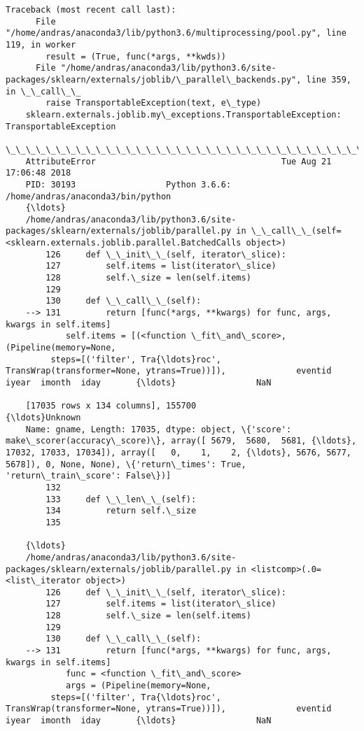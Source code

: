 \documentclass[11pt]{article}
\begin{document}
\begin{Verbatim}[commandchars=\\\{\}]
    Traceback (most recent call last):
      File "/home/andras/anaconda3/lib/python3.6/multiprocessing/pool.py", line 119, in worker
        result = (True, func(*args, **kwds))
      File "/home/andras/anaconda3/lib/python3.6/site-packages/sklearn/externals/joblib/\_parallel\_backends.py", line 359, in \_\_call\_\_
        raise TransportableException(text, e\_type)
    sklearn.externals.joblib.my\_exceptions.TransportableException: TransportableException
    \_\_\_\_\_\_\_\_\_\_\_\_\_\_\_\_\_\_\_\_\_\_\_\_\_\_\_\_\_\_\_\_\_\_\_\_\_\_\_\_\_\_\_\_\_\_\_\_\_\_\_\_\_\_\_\_\_\_\_\_\_\_\_\_\_\_\_\_\_\_\_\_\_\_\_
    AttributeError                                     Tue Aug 21 17:06:48 2018
    PID: 30193                  Python 3.6.6: /home/andras/anaconda3/bin/python
    {\ldots}
    /home/andras/anaconda3/lib/python3.6/site-packages/sklearn/externals/joblib/parallel.py in \_\_call\_\_(self=<sklearn.externals.joblib.parallel.BatchedCalls object>)
        126     def \_\_init\_\_(self, iterator\_slice):
        127         self.items = list(iterator\_slice)
        128         self.\_size = len(self.items)
        129 
        130     def \_\_call\_\_(self):
    --> 131         return [func(*args, **kwargs) for func, args, kwargs in self.items]
            self.items = [(<function \_fit\_and\_score>, (Pipeline(memory=None,
         steps=[('filter', Tra{\ldots}roc', TransWrap(transformer=None, ytrans=True))]),              eventid  iyear  imonth  iday       {\ldots}                NaN  
    
    [17035 rows x 134 columns], 155700                                          {\ldots}Unknown
    Name: gname, Length: 17035, dtype: object, \{'score': make\_scorer(accuracy\_score)\}, array([ 5679,  5680,  5681, {\ldots}, 17032, 17033, 17034]), array([   0,    1,    2, {\ldots}, 5676, 5677, 5678]), 0, None, None), \{'return\_times': True, 'return\_train\_score': False\})]
        132 
        133     def \_\_len\_\_(self):
        134         return self.\_size
        135 
    
    {\ldots}
    /home/andras/anaconda3/lib/python3.6/site-packages/sklearn/externals/joblib/parallel.py in <listcomp>(.0=<list\_iterator object>)
        126     def \_\_init\_\_(self, iterator\_slice):
        127         self.items = list(iterator\_slice)
        128         self.\_size = len(self.items)
        129 
        130     def \_\_call\_\_(self):
    --> 131         return [func(*args, **kwargs) for func, args, kwargs in self.items]
            func = <function \_fit\_and\_score>
            args = (Pipeline(memory=None,
         steps=[('filter', Tra{\ldots}roc', TransWrap(transformer=None, ytrans=True))]),              eventid  iyear  imonth  iday       {\ldots}                NaN  
    

\end{Verbatim}
\end{document}
